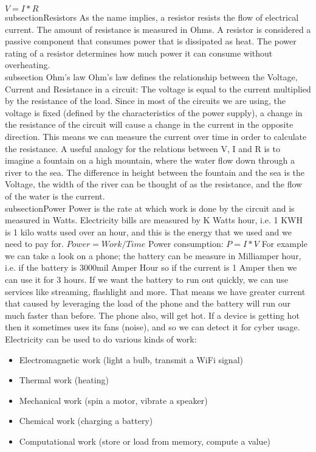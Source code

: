 $V=I*R$
\\subsection{Resistors}
As the name implies, a resistor resists the flow of electrical current. The amount of resistance is measured in Ohms. A resistor is considered a passive component that consumes power that is dissipated as heat. The power rating of a resistor determines how much power it can consume without overheating.
\newline
\\subsection{ Ohm's law}
Ohm's law defines the relationship between the Voltage, Current and Resistance in a circuit: The voltage is equal to the current multiplied by the resistance of the load. Since in most of the circuits we are using, the voltage is fixed (defined by the characteristics of the power supply), a change in the resistance of the circuit will cause a change in the current in the opposite direction. This means we can measure the current over time in order to calculate the resistance.
A useful analogy for the relations between V, I and R is to imagine a fountain on a high mountain, where the water flow down through a river to the sea. The difference in height between the fountain and the sea is the Voltage, the width of the river can be thought of as the resistance, and the flow of the water is the current.
\\subsection{Power}
Power is the rate at which work is done by the circuit and is measured in Watts. Electricity bills are measured by K Watts hour, i.e. 1 KWH is 1 kilo watts used over an hour, and this is the energy that we used and we need to pay for.
$Power = Work / Time$
\newline
Power consumption: $P=I*V$
For example we can take a look on a phone; the battery can be measure in Milliamper hour, i.e. if the battery is 3000mil Amper Hour so if the current is 1 Amper then we can use it for 3 hours. If we want the battery to run out quickly, we can use services like streaming, flashlight and more. That means we have greater current that caused by leveraging the load of the phone and the battery will run our much faster than before. The phone also, will get hot. If a device is getting hot then it sometimes uses its fans (noise), and so we can detect it for cyber usage.
\newline
Electricity can be used to do various kinds of work:
\begin{itemize}
    \item Electromagnetic work (light a bulb, transmit a WiFi signal)
    \item Thermal work (heating)
    \item Mechanical work (spin a motor, vibrate a speaker)
    \item Chemical work (charging a battery)
    \item Computational work (store or load from memory, compute a value)
\end{itemize}
